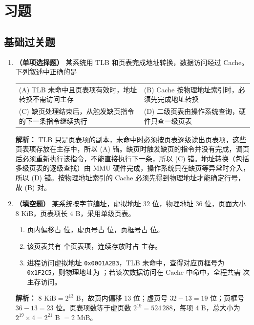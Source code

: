 \section{习题}

\subsection{基础过关题}

\begin{enumerate}

\item \textbf{（单项选择题）} 某系统用 TLB 和页表完成地址转换，数据访问经过 Cache。下列叙述中正确的是
\begin{center}
\small
\begin{tabularx}{0.98\linewidth}{@{}XX@{}}
(A) TLB 未命中且页表项有效时，地址转换不需访问主存 & (B) Cache 按物理地址索引时，必须先完成地址转换 \\[4pt]
(C) 缺页处理结束后，从触发缺页指令的下一条指令继续执行 & (D) 二级页表由操作系统查询，硬件只查一级页表
\end{tabularx}
\end{center}

\ifshowsolutions\par\noindent\textbf{解析：} TLB 只是页表项的副本，未命中时必须按页表逐级读出页表项，这些页表项存放在主存中，所以 (A) 错。缺页时触发缺页的指令并没有完成，调页后必须重新执行该指令，不能直接执行下一条，所以 (C) 错。地址转换（包括多级页表的逐级查找）由 MMU 硬件完成，操作系统只在缺页等异常时介入，所以 (D) 错。按物理地址索引的 Cache 必须先得到物理地址才能确定行号，故 (B) 对。\else \answerarea \fi

\item \textbf{（填空题）} 某系统按字节编址，虚拟地址 32 位，物理地址 36 位，页面大小 8 KiB，页表项长 4 B，采用单级页表。
\begin{enumerate}
\item[(1)] 页内偏移占 \underline{\qquad} 位，虚页号占 \underline{\qquad} 位，页框号占 \underline{\qquad} 位。
\item[(2)] 该页表共有 \underline{\qquad} 个页表项，连续存放时占 \underline{\qquad} 主存。
\item[(3)] 进程访问虚拟地址 \texttt{0x0001A2B3}，TLB 未命中，查得对应页框号为 \texttt{0x1F2C5}，则物理地址为 \underline{\qquad}；若该次数据访问在 Cache 中命中，全程共需 \underline{\qquad} 次主存访问。
\end{enumerate}

\ifshowsolutions\par\noindent\textbf{解析：} $8\text{ KiB}=2^{13}$ B，故页内偏移 13 位；虚页号 $32-13=19$ 位；页框号 $36-13=23$ 位。页表项数等于虚页数 $2^{19}=524\,288$，每项 4 B，总大小为 $2^{19}\times 4=2^{21}$ B $=2$ MiB。


\end{enumerate}
